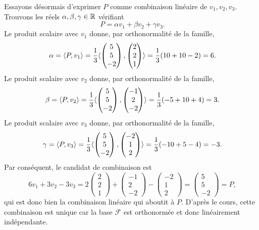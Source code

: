 {	Essayons désormais d'exprimer $P$ comme combinaison linéaire de $v_1, v_2, v_3$.
	Trouvons les réels $\alpha, \beta, \gamma\in\mathbb{R}$ vérifiant
		\[ P = \alpha v_1 + \beta v_2 + \gamma v_3. \]
	Le produit scalaire avec $v_1$ donne, par orthonormalité de la famille,
		\[ \alpha = \langle P, v_1 \rangle = \frac13 \langle \begin{pmatrix} 5 \\ 5 \\ -2 \end{pmatrix}, \begin{pmatrix} 2 \\ 2 \\ 1 \end{pmatrix} \rangle = \frac13(10+10-2) = 6. \]
	Le produit scalaire avec $v_2$ donne, par orthonormalité de la famille,
		\[ \beta = \langle P, v_2 \rangle = \frac13 \langle \begin{pmatrix} 5 \\ 5 \\ -2 \end{pmatrix}, \begin{pmatrix} -1 \\ 2 \\ -2 \end{pmatrix} \rangle = \frac13(-5 + 10 + 4) = 3. \]
	Le produit scalaire avec $v_3$ donne, par orthonormalité de la famille,
		\[ \gamma = \langle P, v_3 \rangle = \frac13 \langle \begin{pmatrix} 5 \\ 5 \\ -2 \end{pmatrix}, \begin{pmatrix} -2 \\ 1 \\ 2 \end{pmatrix} \rangle = \frac13(-10+5-4) = -3. \]
	Par conséquent, le candidat de combinaison est
		\[ 6v_1 + 3v_2 - 3v_3 = 2\begin{pmatrix} 2 \\ 2 \\ 1 \end{pmatrix} +  \begin{pmatrix} -1 \\ 2 \\ -2 \end{pmatrix} - \begin{pmatrix} -2 \\ 1 \\ 2 \end{pmatrix} = \begin{pmatrix}5\\5\\-2\end{pmatrix} = P, \]
	qui est donc bien la combinaison linéaire qui aboutit à $P$.
	D'après le cours, cette combinaison est unique car la base $\mathcal{F}$ est orthonormée et donc linéairement indépendante.
	
}
